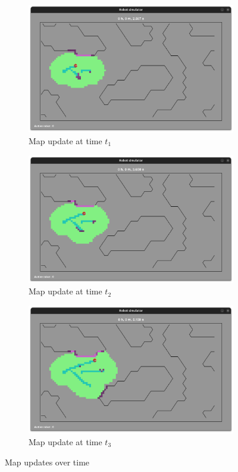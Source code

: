 \documentclass[../main.tex]{subfiles}
\begin{document}
\begin{figure}[H]
	\centering
	\begin{subfigure}{0.4\textwidth}
		\centering
		\includegraphics[width=\textwidth]{IMAGES/part5/lgm_t1.png}
		\caption{Map update at time $t_1$}
	\end{subfigure}
	\hfill
	\begin{subfigure}{0.4\textwidth}
		\centering
		\includegraphics[width=\textwidth]{IMAGES/part5/lgm_t2.png}
		\caption{Map update at time $t_2$}
	\end{subfigure}
	\vfill
	\begin{subfigure}{0.4\textwidth}
		\centering
		\includegraphics[width=\textwidth]{IMAGES/part5/lgm_t3.png}
		\caption{Map update at time $t_3$}
	\end{subfigure}
	\caption{Map updates over time}
	\label{fig:map_updates}
\end{figure}
\end{document}
